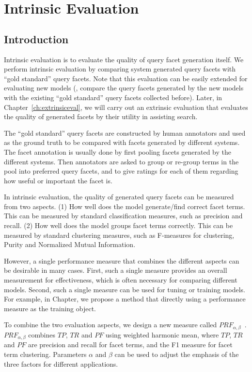 \chapter{Intrinsic Evaluation} 
\label{ch:intrinsiceval}
\section{Introduction}
Intrinsic evaluation is to evaluate the quality of query facet generation itself. We perform intrinsic evaluation by comparing system generated query facets with ``gold standard'' query facets. Note that this evaluation can be easily extended for evaluating new models (\ie, compare the query facets generated by the new models with the existing ``gold standard'' query facets  collected before). Later, in Chapter~\ref{ch:extrinsiceval}, we will carry out an extrinsic evaluation that evaluates the quality of generated facets by their utility in assisting search.

The ``gold standard'' query facets are constructed by human annotators and used as the ground truth to be compared with facets generated by different systems. The facet annotation is usually done by first pooling facets generated by the different systems. Then annotators are asked to group or re-group terms in the pool into preferred query facets, and to give ratings for each of them regarding how useful or important the facet is.


In intrinsic evaluation, the quality of generated query facets can be measured from two aspects. (1) How well does the model generate/find correct facet terms. This can be measured by standard classification measures, such as precision and recall. (2) How well does the model groups facet terms correctly. This can be measured by standard clustering measures, such as F-measures for clustering, Purity and Normalized Mutual Information.

However, a single performance measure that combines the different aspects can be desirable in many cases. First, such a single measure provides an overall measurement for effectiveness, which is often necessary for comparing different models. Second, such a single measure can be used for tuning or training models. For example, in Chapter, we propose a method that directly using a performance measure as the training object. 

To combine the two evaluation aspects, we design a new measure called $PRF_{\alpha,\beta}$~\cite{kong2013extracting}. $PRF_{\alpha,\beta}$ combines $TP$, $TR$ and $PF$ using weighted harmonic mean, where $TP$, $TR$ and $PF$ are precision and recall for facet terms, and the F1 measure for facet term clustering. Parameters $\alpha$ and $\beta$ can be used to adjust the emphasis of the three factors for different applications.


